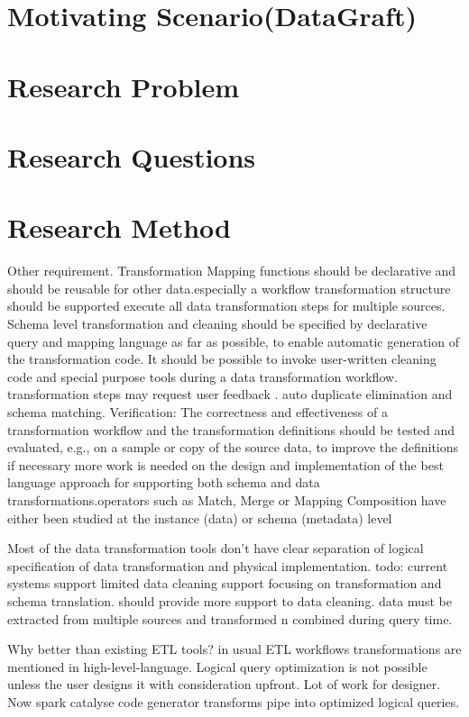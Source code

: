 \section{Motivating Scenario(DataGraft)}

\section{Research Problem}

\section{Research Questions}

\section{Research Method}

Other requirement.
Transformation Mapping functions should be declarative and should be reusable for other data.especially a workflow transformation structure  should be supported execute all data transformation steps for multiple sources. Schema level transformation and cleaning should be specified by declarative query and mapping language as far as possible, to enable automatic generation of the transformation code. It should be possible to invoke user-written cleaning code and special purpose tools during a data transformation workflow.  transformation steps may request user feedback . auto duplicate elimination and schema matching.
Verification: The correctness and effectiveness of a transformation workflow and the transformation definitions should be tested and evaluated, e.g., on a sample or copy of the source data, to improve the definitions if necessary
more work is needed on the design and implementation of the best language approach for supporting both schema and data transformations.operators such as Match, Merge or Mapping Composition have either been studied at the instance (data) or schema (metadata) level 

Most of the data transformation tools don't have clear separation of logical specification of data transformation and physical implementation. \cite{declarativedatacleaning}
todo: current systems support limited data cleaning support focusing on transformation and schema translation. should provide more support to data cleaning. data must be extracted from multiple sources and transformed n combined  during query time.  

Why better than existing ETL tools? in usual ETL workflows transformations are mentioned in high-level-language. Logical query optimization is not possible unless the user designs it with consideration upfront\cite{ETL}. Lot of work for designer. Now spark catalyse code generator transforms pipe into optimized logical queries. 


